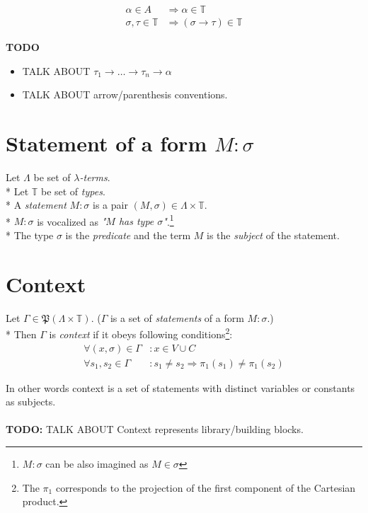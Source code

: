 \documentclass[12pt,a4paper]{report}
\begin{document}
	\begin{align*}
	\alpha      \in A          &\Rightarrow     \alpha   \in \mathbb{T} \\
	\sigma,\tau \in \mathbb{T} &\Rightarrow ( \sigma \rightarrow  \tau ) \in \mathbb{T} 
	\end{align*} 

\textbf{TODO} 
\begin{itemize}
	\item TALK ABOUT $\tau_1 \rightarrow \dots \rightarrow \tau_n \rightarrow \alpha$ 
	\item TALK ABOUT arrow/parenthesis conventions. 
\end{itemize}
	
	
\section{Statement of a form $M : \sigma$}

	Let $\Lambda$ be set of {\it $\lambda$-terms}. \\*
	Let $\mathbb{T}$ be set of {\it types}.       \\*
	A {\it statement} $M : \sigma$ is a pair $(M,\sigma) \in \Lambda \times \mathbb{T}$. \\*
	$M : \sigma$ is vocalized as {\it "$M$ has type $\sigma$"}.\footnote{ 
	$M : \sigma$ can be also imagined as $M \in \sigma$ } \\*
	The type $\sigma$ is the {\it predicate} and the term $M$ is the
	{\it subject} of the statement.  
	
\section{Context}

	Let $\Gamma \in \mathfrak P \left({\Lambda \times  \mathbb{T}}\right)$. 
	($\Gamma$ is a set of {\it statements} of a form $M : \sigma$.)	\\*
	Then $\Gamma$ is {\it context} if it obeys following 
	conditions\footnote{
	The $\pi_1$ corresponds to the projection of the first component of the Cartesian product.
	}:
	\begin{align*}
		 \forall (x,\sigma) \in \Gamma &: x \in V \cup C \\
		 \forall s_1,s_2 \in \Gamma &: s_1 \neq s_2 \Rightarrow \pi_1(s_1) \neq \pi_1(s_2)
    \end{align*}
    
	In other words context is a set of statements with distinct variables or constants as subjects.
	\\\\
	\textbf{TODO:} TALK ABOUT Context represents library/building blocks.
	
\end{document}
